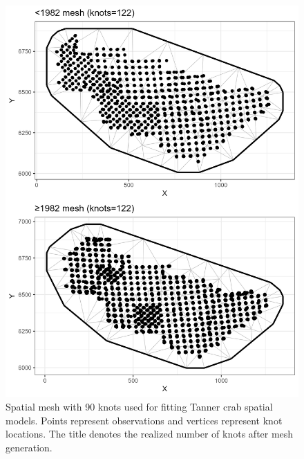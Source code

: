 \documentclass[
]{article}
\begin{document}
\begin{figure}

{\centering \includegraphics[width=6in]{../BAIRDI/Figures/mesh90} 

}

\caption{Spatial mesh with 90 knots used for fitting Tanner crab spatial models. Points represent observations and vertices represent knot locations. The title denotes the realized number of knots after mesh generation. }\label{fig:bairdi-90-mesh}
\end{figure}
\end{document}
